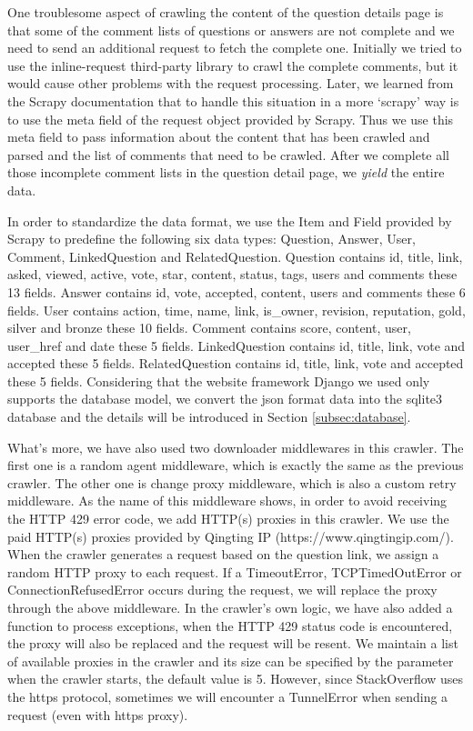 \documentclass[10pt,journal,compsoc]{IEEEtran}
\begin{document}
One troublesome aspect of crawling the content of the question details page is that some of the comment lists of questions or answers are not complete and we need to send an additional request to fetch the complete one. Initially we tried to use the inline-request third-party library to crawl the complete comments, but it would cause other problems with the request processing. Later, we learned from the Scrapy documentation that to handle this situation in a more ‘scrapy’ way is to use the meta field of the request object provided by Scrapy. Thus we use this meta field to pass information about the content that has been crawled and parsed and the list of comments that need to be crawled. After we complete all those incomplete comment lists in the question detail page, we \emph{yield} the entire data.

In order to standardize the data format, we use the Item and Field provided by Scrapy to predefine the following six data types: Question, Answer, User, Comment, LinkedQuestion and RelatedQuestion. Question contains id, title, link, asked, viewed, active, vote, star, content, status, tags, users and comments these 13 fields. Answer contains id, vote, accepted, content, users and comments these 6 fields. User contains action, time, name, link, is\_owner, revision, reputation, gold, silver and bronze these 10 fields. Comment contains score, content, user, user\_href and date these 5 fields. LinkedQuestion contains id, title, link, vote and accepted these 5 fields. RelatedQuestion contains id, title, link, vote and accepted these 5 fields. Considering that the website framework Django we used only supports the database model, we convert the json format data into the sqlite3 database and the details will be introduced in Section \ref{subsec:database}.

What's more, we have also used two downloader middlewares in this crawler. The first one is a random agent middleware, which is exactly the same as the previous crawler. The other one is change proxy middleware, which is also a custom retry middleware. As the name of this middleware shows, in order to avoid receiving the HTTP 429 error code, we add HTTP(s) proxies in this crawler. We use the paid HTTP(s) proxies provided by Qingting IP (https://www.qingtingip.com/). When the crawler generates a request based on the question link, we assign a random HTTP proxy to each request. If a TimeoutError, TCPTimedOutError or ConnectionRefusedError occurs during the request, we will replace the proxy through the above middleware. In the crawler's own logic, we have also added a function to process exceptions, when the HTTP 429 status code is encountered, the proxy will also be replaced and the request will be resent. We maintain a list of available proxies in the crawler and its size can be specified by the parameter when the crawler starts, the default value is 5. However, since StackOverflow uses the https protocol, sometimes we will encounter a TunnelError when sending a request (even with https proxy). 
\end{document}
